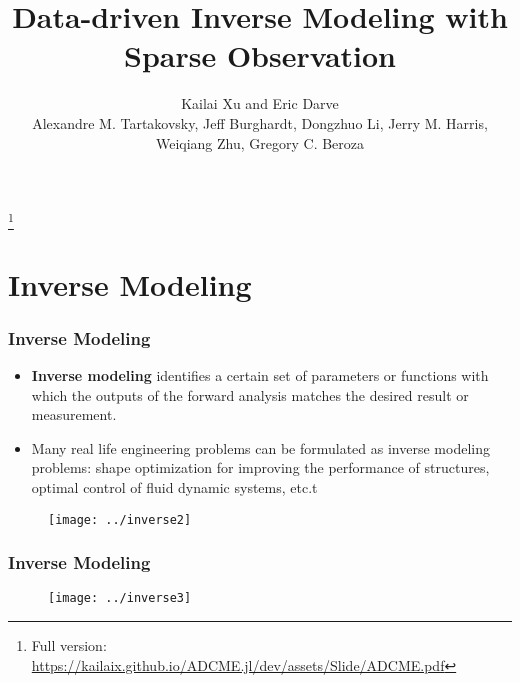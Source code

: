 \documentclass[usenames,dvipsnames]{beamer}
\title[Physics Constrained Learning]{Data-driven Inverse Modeling with Sparse Observation} %
\author[Kailai Xu, et al.]{Kailai Xu and Eric Darve\\ { Alexandre M. Tartakovsky, Jeff Burghardt, Dongzhuo Li, Jerry M. Harris, Weiqiang Zhu, Gregory C. Beroza} }%
\date{}%
\newcommand\blfootnote[1]{%
  \begingroup
  \renewcommand\thefootnote{}\footnote{#1}%
  \addtocounter{footnote}{-1}%
  \endgroup
}
\begin{document}
\begin{frame}

\titlepage %


\blfootnote{\scriptsize Full version: \url{https://kailaix.github.io/ADCME.jl/dev/assets/Slide/ADCME.pdf} }
\end{frame}
\usebackgroundtemplate{}

\section{Inverse Modeling}



\begin{frame}
	\frametitle{Inverse Modeling}
	\begin{itemize}
		\item \textbf{Inverse modeling} identifies a certain set of parameters or functions with which the outputs of the forward analysis matches the desired result or measurement.
		\item Many real life engineering problems can be formulated as inverse modeling problems: shape optimization for improving the performance of structures, optimal control of fluid dynamic systems, etc.t
	\end{itemize}
	\begin{figure}[hbt]
	\centering
  \texttt{[image: ../inverse2]}
\end{figure}
\end{frame}

\begin{frame}
	\frametitle{Inverse Modeling}
	\begin{figure}
	\centering
  \texttt{[image: ../inverse3]}
\end{figure}
\end{frame}
\end{document}

